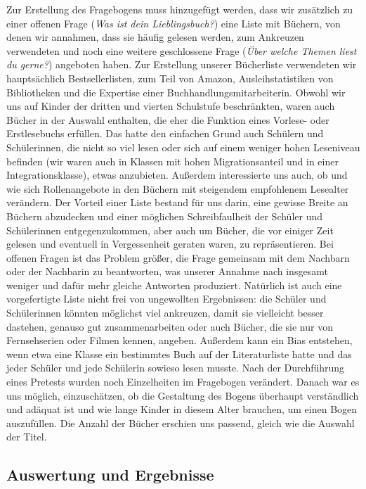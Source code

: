 Zur Erstellung des Fragebogens muss hinzugefügt werden, dass wir
zusätzlich zu einer offenen Frage (\emph{Was ist dein Lieblingsbuch?})
eine Liste mit Büchern, von denen wir annahmen, dass sie häufig gelesen
werden, zum Ankreuzen verwendeten und noch eine weitere geschlossene
Frage (\emph{Über welche Themen liest du gerne?}) angeboten haben. Zur
Erstellung unserer Bücherliste verwendeten wir hauptsächlich
Bestsellerlisten, zum Teil von Amazon, Ausleihstatistiken von
Bibliotheken und die Expertise einer Buchhandlungsmitarbeiterin. Obwohl
wir uns auf Kinder der dritten und vierten Schulstufe beschränkten,
waren auch Bücher in der Auswahl enthalten, die eher die Funktion eines
Vorlese- oder Erstlesebuchs erfüllen. Das hatte den einfachen Grund auch
Schülern und Schülerinnen, die nicht so viel lesen oder sich auf einem
weniger hohen Leseniveau befinden (wir waren auch in Klassen mit hohen
Migrationsanteil und in einer Integrationsklasse), etwas anzubieten.
Außerdem interessierte uns auch, ob und wie sich Rollenangebote in den
Büchern mit steigendem empfohlenem Lesealter verändern. Der Vorteil
einer Liste bestand für uns darin, eine gewisse Breite an Büchern
abzudecken und einer möglichen Schreibfaulheit der Schüler und
Schülerinnen entgegenzukommen, aber auch um Bücher, die vor einiger Zeit
gelesen und eventuell in Vergessenheit geraten waren, zu repräsentieren.
Bei offenen Fragen ist das Problem größer, die Frage gemeinsam mit dem
Nachbarn oder der Nachbarin zu beantworten, was unserer Annahme nach
insgesamt weniger und dafür mehr gleiche Antworten produziert. Natürlich
ist auch eine vorgefertigte Liste nicht frei von ungewollten
Ergebnissen: die Schüler und Schülerinnen könnten möglichst viel
ankreuzen, damit sie vielleicht besser dastehen, genauso gut
zusammenarbeiten oder auch Bücher, die sie nur von Fernsehserien oder
Filmen kennen, angeben. Außerdem kann ein Bias entstehen, wenn etwa eine
Klasse ein bestimmtes Buch auf der Literaturliste hatte und das jeder
Schüler und jede Schülerin sowieso lesen musste. Nach der Durchführung
eines Pretests wurden noch Einzelheiten im Fragebogen verändert. Danach
war es uns möglich, einzuschätzen, ob die Gestaltung des Bogens
überhaupt verständlich und adäquat ist und wie lange Kinder in diesem
Alter brauchen, um einen Bogen auszufüllen. Die Anzahl der Bücher
erschien uns passend, gleich wie die Auswahl der Titel.

\subsection{Auswertung und Ergebnisse}

